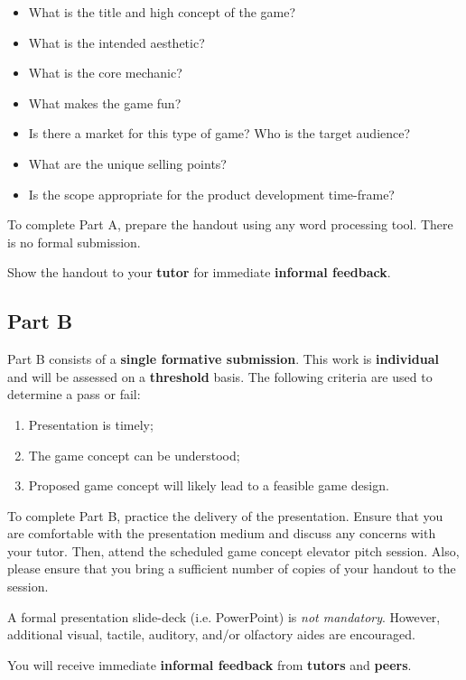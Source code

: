 \documentclass{../../fal_assignment}
\begin{document}
\begin{itemize}
	\item What is the title and high concept of the game?
	\item What is the intended aesthetic?
	\item What is the core mechanic? 
	\item What makes the game fun?
	\item Is there a market for this type of game? Who is the target audience?
	\item What are the unique selling points?
	\item Is the scope appropriate for the product development time-frame?
\end{itemize}

To complete Part A, prepare the handout using any word processing tool. There is no formal submission.

Show the handout to your \textbf{tutor} for immediate \textbf{informal feedback}.

\subsection*{Part B}

Part B consists of a \textbf{single formative submission}. This work is \textbf{individual} and will be assessed on a \textbf{threshold} basis. The following criteria are used to determine a pass or fail:

\begin{enumerate}[label=(\alph*)]
	\item Presentation is timely;
	\item The game concept can be understood;
	\item Proposed game concept will likely lead to a feasible game design.
\end{enumerate}

To complete Part B, practice the delivery of the presentation. Ensure that you are comfortable with the presentation medium and discuss any concerns with your tutor. Then, attend the scheduled game concept elevator pitch session. Also, please ensure that you bring a sufficient number of copies of your handout to the session.

A formal presentation slide-deck (i.e. PowerPoint) is \textit{not mandatory}. However, additional visual, tactile, auditory, and/or olfactory aides are encouraged.

You will receive immediate \textbf{informal feedback} from \textbf{tutors} and \textbf{peers}.
\end{document}
